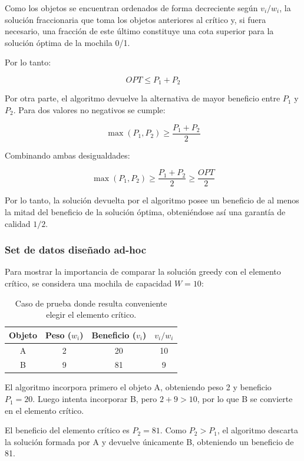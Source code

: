 \documentclass[11pt,a4paper]{article}
\begin{document}
Como los objetos se encuentran ordenados de forma decreciente según
$v_i/w_i$, la solución fraccionaria que toma los objetos anteriores al crítico
y, si fuera necesario, una fracción de este último constituye una cota superior
para la solución óptima de la mochila 0/1.

Por lo tanto:

\[
OPT \leq P_1 + P_2
\]

Por otra parte, el algoritmo devuelve la alternativa de mayor beneficio entre
$P_1$ y $P_2$. Para dos valores no negativos se cumple:

\[
\max(P_1,P_2) \geq \frac{P_1+P_2}{2}
\]

Combinando ambas desigualdades:

\[
\max(P_1,P_2)
\geq \frac{P_1+P_2}{2}
\geq \frac{OPT}{2}
\]

Por lo tanto, la solución devuelta por el algoritmo posee un beneficio de al
menos la mitad del beneficio de la solución óptima, obteniéndose así una
garantía de calidad $1/2$.

\subsubsection{Set de datos diseñado ad-hoc}

Para mostrar la importancia de comparar la solución greedy con el elemento
crítico, se considera una mochila de capacidad $W=10$:

\begin{table}[h]
    \centering
    \begin{tabular}{cccc}
        \toprule
        \textbf{Objeto} & \textbf{Peso ($w_i$)} & \textbf{Beneficio ($v_i$)} & \textbf{$v_i/w_i$} \\
        \midrule
        A & 2 & 20 & 10 \\
        B & 9 & 81 & 9 \\
        \bottomrule
    \end{tabular}
    \caption{Caso de prueba donde resulta conveniente elegir el elemento crítico.}
\end{table}

El algoritmo incorpora primero el objeto A, obteniendo peso 2 y beneficio
$P_1=20$. Luego intenta incorporar B, pero $2+9>10$, por lo que B se convierte
en el elemento crítico.

El beneficio del elemento crítico es $P_2=81$. Como $P_2>P_1$, el algoritmo
descarta la solución formada por A y devuelve únicamente B, obteniendo un
beneficio de 81.
\end{document}

